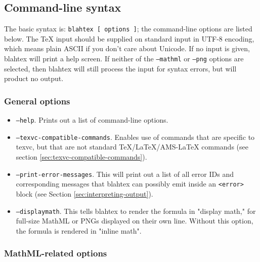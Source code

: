 \documentclass{article}
\begin{document}
\subsection{Command-line syntax}\label{sec:command-line-syntax}

The basic syntax is: \texttt{blahtex [ options ]}; the command-line options are listed below. The \TeX{} input should be supplied on standard input in UTF-8 encoding, which means plain ASCII if you don't care about Unicode. If no input is given, blahtex will print a help screen. If neither of the \texttt{--mathml} or \texttt{--png} options are selected, then blahtex will still process the input for syntax errors, but will product no output.

\subsubsection{General options}

\begin{itemize}
\item \texttt{--help}. Prints out a list of command-line options.
\item \texttt{--texvc-compatible-commands}. Enables use of commands that are specific to texvc, but that are not standard \TeX{}/\LaTeX{}/AMS-\LaTeX{} commands (see section \ref{sec:texvc-compatible-commands}).
\item \texttt{--print-error-messages}. This will print out a list of all error IDs and corresponding messages that blahtex can possibly emit inside an \texttt{<error>} block (see Section \ref{sec:interpreting-output}).
\item \texttt{--displaymath}. This tells blahtex to render the formula in "display math," for full-size MathML or PNGs displayed on their own line. Without this option, the formula is rendered in "inline math".
\end{itemize}

\subsubsection{MathML-related options}
\end{document}
